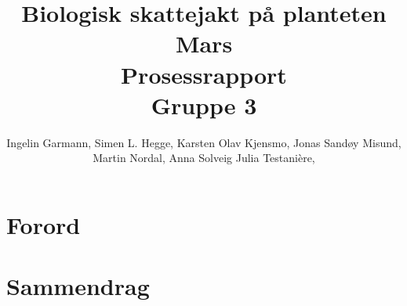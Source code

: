 \documentclass[DIV=calc, paper=a4, fontsize=12pt]{scrartcl}	 %
\title{Biologisk skattejakt på planteten Mars \\ Prosessrapport \\ Gruppe 3} %
\author{Ingelin Garmann, Simen L. Hegge, Karsten Olav Kjensmo, Jonas Sandøy Misund, Martin Nordal, Anna Solveig Julia Testani\`{e}re, } %
\date{} %
\newcommand{\initial}[1]{ %
\lettrine[lines=2,lhang=0.3,nindent=0em]{
\color{DarkBlue}
{\textsf{#1}}}{}}
\begin{document}
\maketitle %

\thispagestyle{fancy} %




\section*{Forord}

\begin{multicols}{2}


\end{multicols}


\section*{Sammendrag}

\begin{multicols}{2}

\end{multicols}


\pagebreak
\renewcommand{\contentsname}%
	{Innhold}

\tableofcontents


\pagebreak


\end{document}
